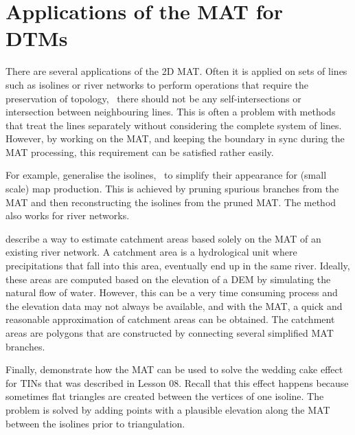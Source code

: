 \section{Applications of the MAT for DTMs}
There are several applications of the 2D MAT.
Often it is applied on sets of lines such as isolines or river networks to perform operations that require the preservation of topology, \ie\ there should not be any self-intersections or intersection between neighbouring lines.
This is often a problem with methods that treat the lines separately without considering the complete system of lines.
However, by working on the MAT, and keeping the boundary in sync during the MAT processing, this requirement can be satisfied rather easily.

For example, \citet{Gold01b} generalise the isolines, \ie\ to simplify their appearance for (small scale) map production. 
This is achieved by pruning spurious branches from the MAT and then reconstructing the isolines from the pruned MAT. 
The method also works for river networks.

\citet{Karimipour13} describe a way to estimate catchment areas based solely on the MAT of an existing river network.
A catchment area is a hydrological unit where precipitations that fall into this area, eventually end up in the same river. 
Ideally, these areas are computed based on the elevation of a DEM by simulating the natural flow of water. 
However, this can be a very time consuming process and the elevation data may not always be available, and with the MAT, a quick and reasonable approximation of catchment areas can be obtained.
The catchment areas are polygons that are constructed by connecting several simplified MAT branches.

Finally, \citet{Dakowicz03} demonstrate how the MAT can be used to solve the wedding cake effect for TINs that was described in Lesson 08. 
Recall that this effect happens because sometimes flat triangles are created between the vertices of one isoline.
The problem is solved by adding points with a plausible elevation along the MAT between the isolines prior to triangulation.


